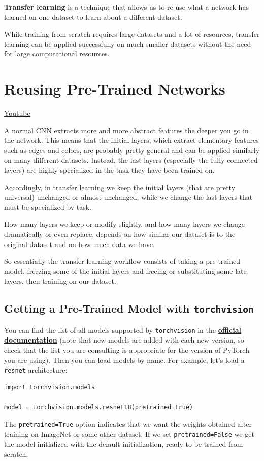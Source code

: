 \textbf{Transfer learning} is a technique that allows us to re-use what a network has learned on one dataset to learn about a different dataset. \newline

While training from scratch requires large datasets and a lot of resources, transfer learning can be applied successfully on much smaller datasets without the need for large computational resources.

\section{Reusing Pre-Trained Networks}
\href{https://www.youtube.com/watch?v=kn4BN7z3UGQ&t=1s&ab_channel=Udacity}{Youtube} \newline

A normal CNN extracts more and more abstract features the deeper you go in the network. This means that the initial layers, which extract elementary features such as edges and colors, are probably pretty general and can be applied similarly on many different datasets. Instead, the last layers (especially the fully-connected layers) are highly specialized in the task they have been trained on. \newline

Accordingly, in transfer learning we keep the initial layers (that are pretty universal) unchanged or almost unchanged, while we change the last layers that must be specialized by task. \newline

How many layers we keep or modify slightly, and how many layers we change dramatically or even replace, depends on how similar our dataset is to the original dataset and on how much data we have.\newline

So essentially the transfer-learning workflow consists of taking a pre-trained model, freezing some of the initial layers and freeing or substituting some late layers, then training on our dataset.

\subsection{Getting a Pre-Trained Model with \lstinline{torchvision}}

You can find the list of all models supported by \lstinline|torchvision| in the \href{https://pytorch.org/vision/stable/models.html}{\textbf{official documentation}} (note that new models are added with each new version, so check that the list you are consulting is appropriate for the version of PyTorch you are using). Then you can load models by name. For example, let's load a \lstinline|resnet| architecture:
\begin{lstlisting}
import torchvision.models

model = torchvision.models.resnet18(pretrained=True)
\end{lstlisting}
The \lstinline{pretrained=True} option indicates that we want the weights obtained after training on ImageNet or some other dataset. If we set \lstinline{pretrained=False} we get the model initialized with the default initialization, ready to be trained from scratch.

